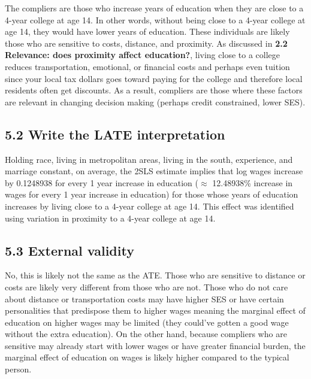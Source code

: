 \documentclass[
  letterpaper,
  DIV=11,
  numbers=noendperiod]{scrartcl}
\begin{document}
The compliers are those who increase years of education when they are
close to a 4-year college at age 14. In other words, without being close
to a 4-year college at age 14, they would have lower years of education.
These individuals are likely those who are sensitive to costs, distance,
and proximity. As discussed in
\textbf{2.2 Relevance: does proximity affect education?}, living close
to a college reduces transportation, emotional, or financial costs and
perhaps even tuition since your local tax dollars goes toward paying for
the college and therefore local residents often get discounts. As a
result, compliers are those where these factors are relevant in changing
decision making (perhaps credit constrained, lower SES).

\subsection{5.2 Write the LATE
interpretation}\label{write-the-late-interpretation}

Holding race, living in metropolitan areas, living in the south,
experience, and marriage constant, on average, the 2SLS estimate implies
that log wages increase by 0.1248938 for every 1 year increase in
education (\(\approx\) 12.48938\% increase in wages for every 1 year
increase in education) for those whose years of education increases by
living close to a 4-year college at age 14. This effect was identified
using variation in proximity to a 4-year college at age 14.

\subsection{5.3 External validity}\label{external-validity}

No, this is likely not the same as the ATE. Those who are sensitive to
distance or costs are likely very different from those who are not.
Those who do not care about distance or transportation costs may have
higher SES or have certain personalities that predispose them to higher
wages meaning the marginal effect of education on higher wages may be
limited (they could've gotten a good wage without the extra education).
On the other hand, because compliers who are sensitive may already start
with lower wages or have greater financial burden, the marginal effect
of education on wages is likely higher compared to the typical person.
\end{document}
